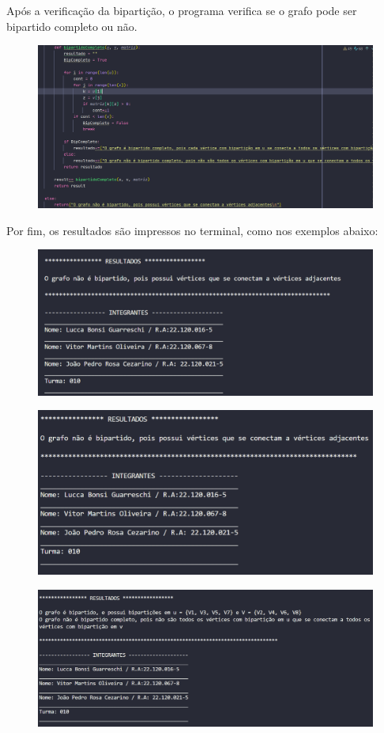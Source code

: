 \documentclass{article}
\begin{document}
		Após a verificação da bipartição, o programa verifica se o grafo pode ser bipartido completo ou não.
	 
	 \begin{figure}[H]
	 	\centering
	 	\includegraphics[width=0.6\linewidth]{"Figuras/Print4"}
	 	\label{fig:print4}
	 	\caption{}
	 \end{figure}\vspace*{0.3cm}
 	\newpage
 
 		Por fim, os resultados são impressos no terminal, como nos exemplos abaixo:
 	
 	\begin{figure}[H]
 		\centering
 		\includegraphics[width=0.6\linewidth]{"Figuras/Print5"}
 		\label{fig:print5}
 		\caption{}
 	\end{figure}\vspace*{0.3cm}
 
	 \begin{figure}[H]
	 	\centering
	 	\includegraphics[width=0.6\linewidth]{"Figuras/Print6"}
	 	\label{fig:print6}
	 	\caption{}
	 \end{figure}\vspace*{0.3cm}

	\begin{figure}[H]
		\centering
		\includegraphics[width=0.6\linewidth]{"Figuras/Print7"}
		\label{fig:print7}
		\caption{}
	\end{figure}\vspace*{0.3cm}
 
 
\end{document}
